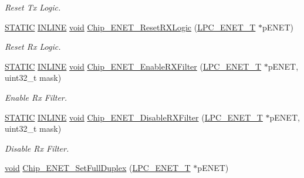 \begin{DoxyCompactItemize}
\begin{DoxyCompactList}\small\item\em Reset Tx Logic. \end{DoxyCompactList}\item 
\hyperlink{group__LPC__Types__Public__Macros_ga10b2d890d871e1489bb02b7e70d9bdfb}{S\-T\-A\-T\-I\-C} \hyperlink{group__LPC__Types__Public__Types_ga2eb6f9e0395b47b8d5e3eeae4fe0c116}{I\-N\-L\-I\-N\-E} \hyperlink{Paradigm_2Tern__EE_2small_2portmacro_8h_a14d32f8130d3c0b212cfc751730b5b49}{void} \hyperlink{group__ENET__17XX__40XX_gaddd915f4c5b177bef0cd29d882ed3e6f}{Chip\-\_\-\-E\-N\-E\-T\-\_\-\-Reset\-R\-X\-Logic} (\hyperlink{structLPC__ENET__T}{L\-P\-C\-\_\-\-E\-N\-E\-T\-\_\-\-T} $\ast$p\-E\-N\-E\-T)
\begin{DoxyCompactList}\small\item\em Reset Rx Logic. \end{DoxyCompactList}\item 
\hyperlink{group__LPC__Types__Public__Macros_ga10b2d890d871e1489bb02b7e70d9bdfb}{S\-T\-A\-T\-I\-C} \hyperlink{group__LPC__Types__Public__Types_ga2eb6f9e0395b47b8d5e3eeae4fe0c116}{I\-N\-L\-I\-N\-E} \hyperlink{Paradigm_2Tern__EE_2small_2portmacro_8h_a14d32f8130d3c0b212cfc751730b5b49}{void} \hyperlink{group__ENET__17XX__40XX_ga87335faab88d9a16579596f4a0a6ce14}{Chip\-\_\-\-E\-N\-E\-T\-\_\-\-Enable\-R\-X\-Filter} (\hyperlink{structLPC__ENET__T}{L\-P\-C\-\_\-\-E\-N\-E\-T\-\_\-\-T} $\ast$p\-E\-N\-E\-T, uint32\-\_\-t mask)
\begin{DoxyCompactList}\small\item\em Enable Rx Filter. \end{DoxyCompactList}\item 
\hyperlink{group__LPC__Types__Public__Macros_ga10b2d890d871e1489bb02b7e70d9bdfb}{S\-T\-A\-T\-I\-C} \hyperlink{group__LPC__Types__Public__Types_ga2eb6f9e0395b47b8d5e3eeae4fe0c116}{I\-N\-L\-I\-N\-E} \hyperlink{Paradigm_2Tern__EE_2small_2portmacro_8h_a14d32f8130d3c0b212cfc751730b5b49}{void} \hyperlink{group__ENET__17XX__40XX_ga591bdc31e1ca992c3ac642c8d64d3ac9}{Chip\-\_\-\-E\-N\-E\-T\-\_\-\-Disable\-R\-X\-Filter} (\hyperlink{structLPC__ENET__T}{L\-P\-C\-\_\-\-E\-N\-E\-T\-\_\-\-T} $\ast$p\-E\-N\-E\-T, uint32\-\_\-t mask)
\begin{DoxyCompactList}\small\item\em Disable Rx Filter. \end{DoxyCompactList}\item 
\hyperlink{Paradigm_2Tern__EE_2small_2portmacro_8h_a14d32f8130d3c0b212cfc751730b5b49}{void} \hyperlink{group__ENET__17XX__40XX_ga0881ac9e0e98620c0e65f9a6d7a43240}{Chip\-\_\-\-E\-N\-E\-T\-\_\-\-Set\-Full\-Duplex} (\hyperlink{structLPC__ENET__T}{L\-P\-C\-\_\-\-E\-N\-E\-T\-\_\-\-T} $\ast$p\-E\-N\-E\-T)

\end{DoxyCompactItemize}
